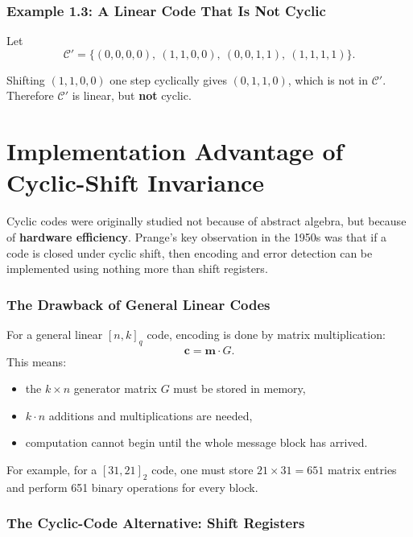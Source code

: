 \documentclass[11pt,oneside]{book}
\providecommand{\tightlist}{\setlength{\itemsep}{0pt}\setlength{\parskip}{0pt}}
\theoremstyle{plain}
\theoremstyle{definition}
\theoremstyle{remark}
\begin{document}
\subsubsection{Example 1.3: A Linear Code That Is Not
Cyclic}\label{example-1.3-a-linear-code-that-is-not-cyclic}

Let
\[\mathcal{C}' = \{(0,0,0,0),\ (1,1,0,0),\ (0,0,1,1),\ (1,1,1,1)\}.\]

Shifting \((1,1,0,0)\) one step cyclically gives \((0,1,1,0)\), which is
not in \(\mathcal{C}'\). Therefore \(\mathcal{C}'\) is linear, but
\textbf{not} cyclic.


\section{Implementation Advantage of Cyclic-Shift Invariance}\label{sec:implementation-advantage}

Cyclic codes were originally studied not because of abstract algebra,
but because of \textbf{hardware efficiency}. Prange's key observation in
the 1950s was that if a code is closed under cyclic shift, then encoding
and error detection can be implemented using nothing more than shift
registers.

\subsubsection{The Drawback of General Linear
Codes}\label{the-drawback-of-general-linear-codes}

For a general linear \([n,k]_q\) code, encoding is done by matrix
multiplication: \[\mathbf{c} = \mathbf{m} \cdot G.\] This means:

\begin{itemize}
\tightlist
\item
  the \(k \times n\) generator matrix \(G\) must be stored in memory,
\item
  \(k \cdot n\) additions and multiplications are needed,
\item
  computation cannot begin until the whole message block has arrived.
\end{itemize}

For example, for a \([31,21]_2\) code, one must store
\(21 \times 31 = 651\) matrix entries and perform 651 binary operations
for every block.

\subsubsection{The Cyclic-Code Alternative: Shift
Registers}\label{the-cyclic-code-alternative-shift-registers}
\end{document}

